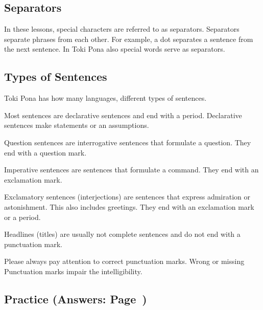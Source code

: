 %
\subsection*{Separators}
%
In these lessons, special characters are referred to as separators. 
Separators separate phrases from each other. 
For example, a dot separates a sentence from the next sentence. 
In Toki Pona also special words serve as separators. 

%
\subsection*{Types of Sentences}
%
%
Toki Pona has how many languages, different types of sentences. 

Most sentences are declarative sentences and end with a period. 
Declarative sentences make statements or an assumptions. 

Question sentences are interrogative sentences that formulate a question. 
They end with a question mark. 

Imperative sentences are sentences that formulate a command. 
They end with an exclamation mark.

Exclamatory sentences (interjections) are sentences that express admiration or astonishment. 
This also includes greetings. 
They end with an exclamation mark or a period.

Headlines (titles) are usually not complete sentences and do not end with a punctuation mark.

Please always pay attention to correct punctuation marks. Wrong or missing
Punctuation marks impair the intelligibility.

%
\newpage
\subsection*{Practice (Answers: Page~\pageref{'pronunciation_alphabet'})}

